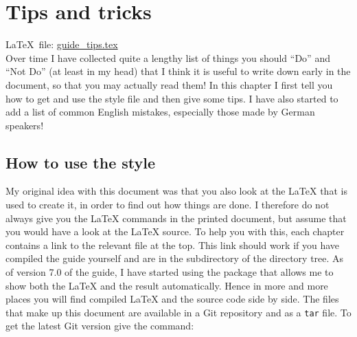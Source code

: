 
\chapter{Tips and tricks}%
\label{sec:tips}

\LaTeX\ file: \href{run:./guide_tips.tex}{guide\_tips.tex}\\[1ex]
\noindent
Over time I have collected quite a lengthy list of things you should
\enquote{Do} and \enquote{Not Do} (at least in my head) that I think
it is useful to write down early in the document, so that you may
actually read them!  In this chapter I first tell you how to get
and use the style file and then give some tips.
I have also started to add a list of common English mistakes,
especially those made by German speakers!

\section{How to use the  style}%
\label{sec:tips:howto}

My original idea with this document was that you also look at the \LaTeX{} that
is used to create it, in order to find out how things are done.
I therefore do not always give you the \LaTeX{} commands in the printed
document, but assume that you would have a look at the \LaTeX{} source.
To help you with this, each chapter contains a link to the relevant
file at the top. This link should work if you have compiled the guide
yourself and are in the  subdirectory of the
 directory tree.
As of version 7.0 of the guide,
I have started using the  package that allows me to show
both the \LaTeX{} and the result automatically.
Hence in more and more places you will find compiled \LaTeX{} and the source code side by side.
The files that make up this document are available in a Git repository and as a \texttt{tar} file.
To get the latest Git version give the command:

